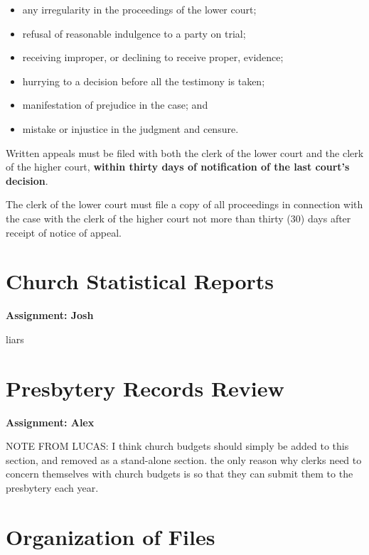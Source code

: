 \documentclass[
]{book}
\providecommand{\tightlist}{%
  \setlength{\itemsep}{0pt}\setlength{\parskip}{0pt}}
\begin{document}
\begin{itemize}
\tightlist
\item
  any irregularity in the proceedings of the lower court;
\item
  refusal of reasonable indulgence to a party on trial;
\item
  receiving improper, or declining to receive proper, evidence;
\item
  hurrying to a decision before all the testimony is taken;
\item
  manifestation of prejudice in the case; and
\item
  mistake or injustice in the judgment and censure.
\end{itemize}

Written appeals must be filed with both the clerk of the lower court and the clerk of the higher court, \textbf{within thirty days of notification of the last court's decision}.

The clerk of the lower court must file a copy of all proceedings in connection with the case with the clerk of the higher court not more than thirty (30) days after receipt of notice of appeal.

\hypertarget{church-statistical-reports}{%
\chapter{Church Statistical Reports}\label{church-statistical-reports}}

\textbf{Assignment: Josh}

liars

\hypertarget{presbytery-records-review}{%
\chapter{Presbytery Records Review}\label{presbytery-records-review}}

\textbf{Assignment: Alex}

NOTE FROM LUCAS: I think church budgets should simply be added to this section, and removed as a stand-alone section. the only reason why clerks need to concern themselves with church budgets is so that they can submit them to the presbytery each year.

\hypertarget{organization-of-files}{%
\chapter{Organization of Files}\label{organization-of-files}}
\end{document}

